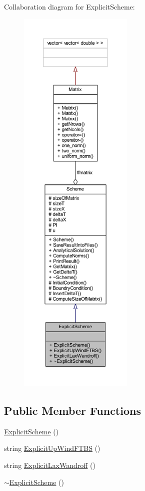 Collaboration diagram for Explicit\+Scheme\+:\nopagebreak
\begin{figure}[H]
\begin{center}
\leavevmode
\includegraphics[height=550pt]{class_explicit_scheme__coll__graph}
\end{center}
\end{figure}
\subsection*{Public Member Functions}
\begin{DoxyCompactItemize}
\item 
\mbox{\hyperlink{class_explicit_scheme_ae63cfb8d333897b625dd17dc2acb4c46}{Explicit\+Scheme}} ()
\item 
string \mbox{\hyperlink{class_explicit_scheme_a52c0d19315a6014f43a9d007c70582d6}{Explicit\+Up\+Wind\+F\+T\+BS}} ()
\item 
string \mbox{\hyperlink{class_explicit_scheme_a2698e08e62763c56b972b478d665c34c}{Explicit\+Lax\+Wandroff}} ()
\item 
\mbox{\hyperlink{class_explicit_scheme_a5eee023f6f9d09609066a50dd620b49a}{$\sim$\+Explicit\+Scheme}} ()
\end{DoxyCompactItemize}
